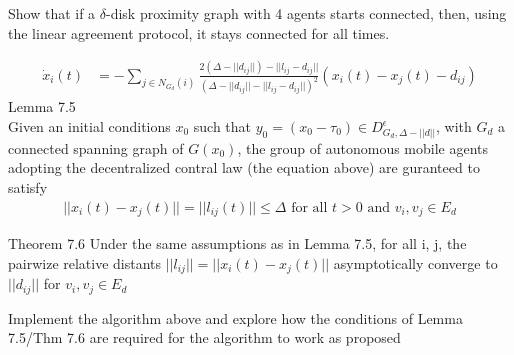 \documentclass{article}
\begin{document}
\newpage
\begin{problem}
Show that if a $\delta$-disk proximity graph with 4 agents starts connected, then, using the linear agreement protocol, it stays connected for all times. 

\end{problem}
\begin{problem}
    \begin{align*}
        \dot x_i(t) &= -\sum_{j \in N_{G_d}(i)} \frac{2(\Delta - ||d_{ij}||) - ||l_{ij} - d_{ij}||}{(\Delta - ||d_{ij}|| - ||l_{ij} - d_{ij}||)^2} (x_i(t) - x_j(t) - d_{ij} )
    \end{align*}
    Lemma 7.5\\
    Given an initial conditions $x_0$ such that $y_0 = (x_0 - \tau_0) \in D_{G_{d}, \Delta -||d||}^\epsilon$, with $G_d$ a connected spanning graph of $G(x_0)$, the group of autonomous mobile agents adopting the decentralized contral law (the equation above) are guranteed to satisfy
    \begin{align*}
        ||x_i(t) - x_j(t)|| = ||l_{ij}(t)|| \leq \Delta \text{ for all } t > 0 \text{ and }{ v_i, v_j} \in E_d
    \end{align*}

    Theorem 7.6
    Under the same assumptions as in Lemma 7.5, for all i, j, the pairwize relative distants $||l_{ij}|| = ||x_i(t) - x_j(t)||$ asymptotically converge to $||d_{ij}||$ for ${v_i, v_j} \in E_d$
    
    \vspace{12pt}
    Implement the algorithm above and explore how the conditions of Lemma 7.5/Thm 7.6 are required for the algorithm to work as proposed    
\end{problem}
    
\end{document}

